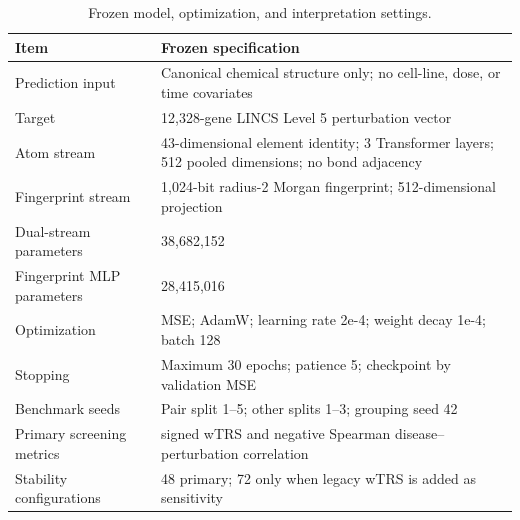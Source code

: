 \begingroup
\small
\begin{table}[H]
\centering
\caption{Frozen model, optimization, and interpretation settings.}
\label{tab:s_settings}
\begin{tabular}{@{}p{}p{}@{}}
\toprule
Item & Frozen specification \\
\midrule
Prediction input & Canonical chemical structure only; no cell-line, dose, or time covariates \\
Target & 12,328-gene LINCS Level 5 perturbation vector \\
Atom stream & 43-dimensional element identity; 3 Transformer layers; 512 pooled dimensions; no bond adjacency \\
Fingerprint stream & 1,024-bit radius-2 Morgan fingerprint; 512-dimensional projection \\
Dual-stream parameters & 38,682,152 \\
Fingerprint MLP parameters & 28,415,016 \\
Optimization & MSE; AdamW; learning rate 2e-4; weight decay 1e-4; batch 128 \\
Stopping & Maximum 30 epochs; patience 5; checkpoint by validation MSE \\
Benchmark seeds & Pair split 1--5; other splits 1--3; grouping seed 42 \\
Primary screening metrics & signed wTRS and negative Spearman disease--perturbation correlation \\
Stability configurations & 48 primary; 72 only when legacy wTRS is added as sensitivity \\
\bottomrule
\end{tabular}
\end{table}
\endgroup
